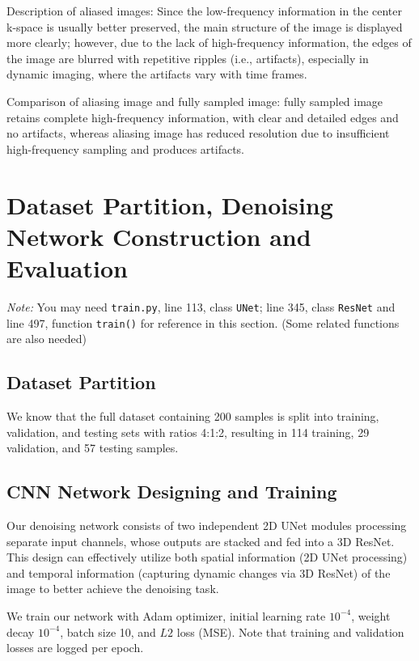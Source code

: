 \documentclass{article}
\begin{document}
Description of aliased images: Since the low-frequency information in the center k-space
is usually better preserved, the main structure of the image is displayed more clearly;
however, due to the lack of high-frequency information, the edges of the image are
blurred with repetitive ripples (i.e., artifacts), especially in dynamic imaging,
where the artifacts vary with time frames.

Comparison of aliasing image and fully sampled image: fully sampled image retains
complete high-frequency information, with clear and detailed edges and no artifacts,
whereas aliasing image has reduced resolution due to insufficient high-frequency
sampling and produces artifacts.



\section{Dataset Partition, Denoising Network Construction and Evaluation}
\textit{Note: }You may need \texttt{train.py}, line 113, class \texttt{UNet};
line 345, class \texttt{ResNet} and line 497, function \texttt{train()}
for reference in this section. (Some related functions are also needed)

\subsection{Dataset Partition}

We know that the full dataset containing 200 samples is split into training, validation,
and testing sets with ratios 4:1:2, resulting in 114 training, 29 validation,
and 57 testing samples.

\subsection{CNN Network Designing and Training}
Our denoising network consists of two independent 2D UNet modules processing
separate input channels, whose outputs are stacked and fed into a 3D ResNet.
This design can effectively utilize both spatial information (2D UNet processing)
and temporal information (capturing dynamic changes via 3D ResNet) of the image
to better achieve the denoising task.

We train our network with Adam optimizer, initial learning rate $10^{-4}$,
weight decay $10^{-4}$, batch size 10, and $L2$ loss (MSE).
Note that training and validation losses are logged per epoch.
\end{document}
